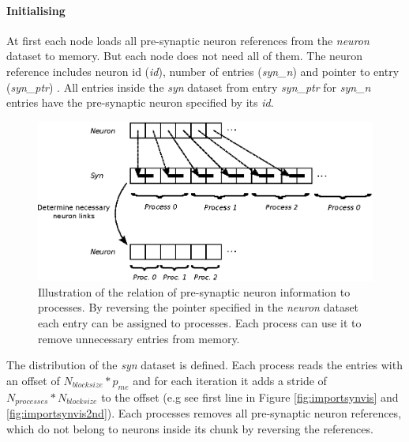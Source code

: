 \paragraph{Initialising}
At first each node loads all pre-synaptic neuron references from the \emph{neuron} dataset to memory.
But each node does not need all of them. 
The neuron reference includes neuron id (\emph{id}), number of entries  (\emph{syn\_n}) and pointer to entry (\emph{syn\_ptr}) .
All entries inside the \emph{syn} dataset from  entry \emph{syn\_ptr} for \emph{syn\_n} entries have the pre-synaptic neuron specified by its \emph{id}.
\begin{figure}[ht!]
\centering
\includegraphics[scale=1.0]{pictures/NeuronLinksRemoving.eps}
\caption{Illustration of the relation of pre-synaptic neuron information to processes.
By reversing the pointer specified in the \emph{neuron} dataset
each entry can be assigned to processes.
Each process can use it to remove unnecessary entries from memory.
}
\label{fig:neuonlinksremoving}
\end{figure}
The distribution of the \emph{syn} dataset is defined.
Each process reads the entries with an offset of $N_{blocksize} * p_{me}$ and
for each iteration it adds a stride of $N_{processes} * N_{blocksize}$  to the offset (e.g see first line in Figure \ref{fig:importsynvis} and \ref{fig:importsynvis2nd}).
Each processes removes all pre-synaptic neuron references, which do not belong to
neurons inside its chunk by reversing the references.

